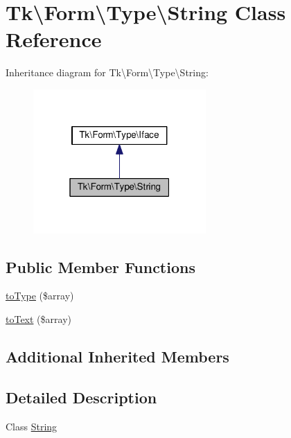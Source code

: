 \hypertarget{classTk_1_1Form_1_1Type_1_1String}{\section{Tk\textbackslash{}Form\textbackslash{}Type\textbackslash{}String Class Reference}
\label{classTk_1_1Form_1_1Type_1_1String}
}


Inheritance diagram for Tk\textbackslash{}Form\textbackslash{}Type\textbackslash{}String\+:\nopagebreak
\begin{figure}[H]
\begin{center}
\leavevmode
\includegraphics[width=187pt]{classTk_1_1Form_1_1Type_1_1String__inherit__graph}
\end{center}
\end{figure}
\subsection*{Public Member Functions}
\begin{DoxyCompactItemize}
\item 
\hyperlink{classTk_1_1Form_1_1Type_1_1String_a687ddd10e59d9f891f813552bb688edf}{to\+Type} (\$array)
\item 
\hyperlink{classTk_1_1Form_1_1Type_1_1String_a8121778c6f81a758872ee94c4b49ebb8}{to\+Text} (\$array)
\end{DoxyCompactItemize}
\subsection*{Additional Inherited Members}


\subsection{Detailed Description}
Class \hyperlink{classTk_1_1Form_1_1Type_1_1String}{String}

